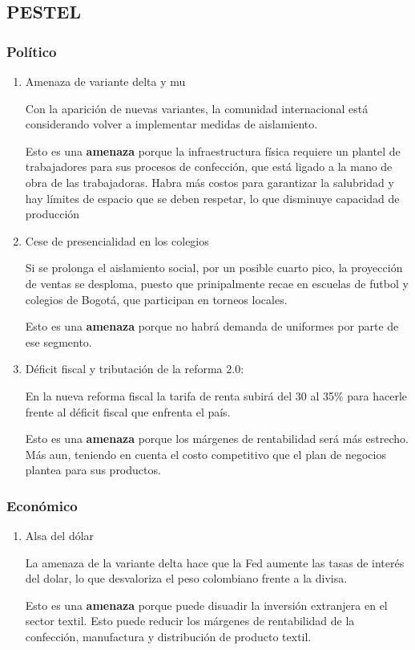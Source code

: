 \documentclass[11pt]{article}
\begin{document}
\subsection{PESTEL}
\label{sec:org37f1fc5}
\subsubsection{Político}
\label{sec:org379aa8c}
\begin{enumerate}
\item Amenaza de variante delta y mu
\label{sec:orgd299be5}

Con la aparición de nuevas variantes, la comunidad internacional está
considerando volver a implementar medidas de aislamiento.

Esto es una \textbf{amenaza} porque la infraestructura física requiere un
plantel de trabajadores para sus procesos de confección, que está
ligado a la mano de obra de las trabajadoras. Habra más costos para
garantizar la salubridad y hay límites de espacio que se deben
respetar, lo que disminuye capacidad de producción

\item Cese de presencialidad en los colegios
\label{sec:orgb222d56}

Si se prolonga el aislamiento social, por un posible cuarto pico, la
proyección de ventas se desploma, puesto que prinipalmente recae en
escuelas de futbol y colegios de Bogotá, que participan en torneos
locales.

Esto es una \textbf{amenaza} porque no habrá demanda de uniformes por
parte de ese segmento.


\item Déficit fiscal y tributación de la reforma 2.0:
\label{sec:orga5490bc}

En la nueva reforma fiscal la tarifa de renta subirá del 30 al 35\%
para hacerle frente al déficit fiscal que enfrenta el país.

Esto es una \textbf{amenaza} porque los márgenes de rentabilidad será más
estrecho.  Más aun, teniendo en cuenta el costo competitivo que el
plan de negocios plantea para sus productos.
\end{enumerate}

\subsubsection{Económico}
\label{sec:org343ccb7}
\begin{enumerate}
\item Alsa del dólar
\label{sec:org32cb05a}
  
La amenaza de la variante delta hace que la Fed aumente las tasas de
interés del dolar, lo que desvaloriza el peso colombiano frente a la
divisa.

Esto es una \textbf{amenaza} porque puede disuadir la inversión extranjera
en el sector textil. Esto puede reducir los márgenes de
rentabilidad de la confección, manufactura y distribución
de producto textil.
\end{enumerate}
\end{document}
